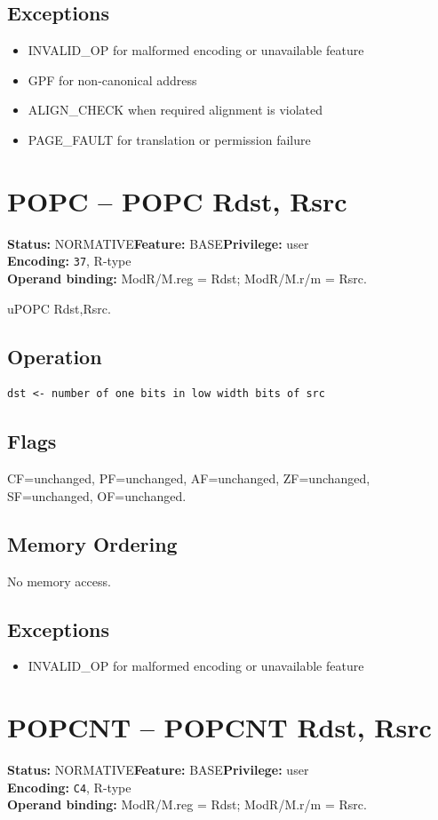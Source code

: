 \documentclass[10pt]{article}
\begin{document}
\subsection*{Exceptions}
\begin{itemize}
\item INVALID\_OP for malformed encoding or unavailable feature
\item GPF for non-canonical address
\item ALIGN\_CHECK when required alignment is violated
\item PAGE\_FAULT for translation or permission failure
\end{itemize}
\clearpage

\section{POPC -- POPC Rdst, Rsrc}
\textbf{Status:} NORMATIVE\quad \textbf{Feature:} BASE\quad \textbf{Privilege:} user\\
\textbf{Encoding:} \texttt{37}, R-type\\
\textbf{Operand binding:} ModR/M.reg = Rdst; ModR/M.r/m = Rsrc.

uPOPC Rdst,Rsrc.

\subsection*{Operation}
\begin{lstlisting}
dst <- number of one bits in low width bits of src
\end{lstlisting}
\subsection*{Flags}
CF=unchanged, PF=unchanged, AF=unchanged, ZF=unchanged, SF=unchanged, OF=unchanged.
\subsection*{Memory Ordering}
No memory access.
\subsection*{Exceptions}
\begin{itemize}
\item INVALID\_OP for malformed encoding or unavailable feature
\end{itemize}
\clearpage

\section{POPCNT -- POPCNT Rdst, Rsrc}
\textbf{Status:} NORMATIVE\quad \textbf{Feature:} BASE\quad \textbf{Privilege:} user\\
\textbf{Encoding:} \texttt{C4}, R-type\\
\textbf{Operand binding:} ModR/M.reg = Rdst; ModR/M.r/m = Rsrc.
\end{document}
